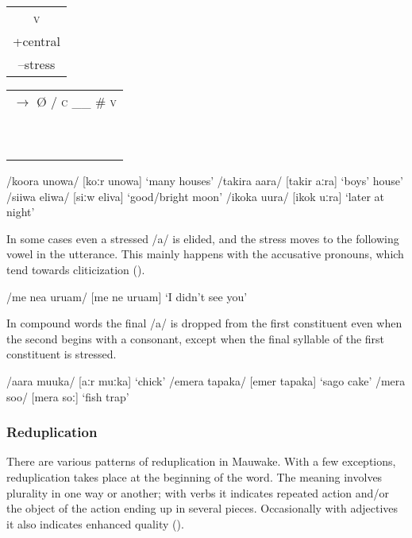 \ea
\begin{tabular}{c}\textsc{v}\\+central\\--stress\\    \end{tabular}
\begin{tabular}{c}    $\rightarrow $ {\O}  /  \textsc{c} \_\_  \#  \textsc{v} \\~\\~\\    \end{tabular}
\z

\ea
\ea
/koora unowa/  [{{\textprimstress}koːr  u{{\textprimstress}}nowa}]  `many houses'
\ex
/takira {\textphi}aara/  [ta{{\textprimstress}kir  {{\textprimstress}}}{\textphi}aːra]  `boys' house'
\ex
/siiwa eliwa/  [{{\textprimstress}siːw  e{{\textprimstress}}liva}]  `good/bright moon'
\ex
/ikoka uura/  [i{{\textprimstress}kok  {{\textprimstress}}uːra}]  `later at night'
\z
\z

In some cases even a stressed /a/ is elided, and the stress moves to the following vowel in the utterance.  This mainly happens with the accusative pronouns, which tend towards cliticization ().

\ea
/me ne{\textphi}a uru{\textphi}am/  [{{\textprimstress}me ne}{\textphi} {{\textprimstress}uru}{\textphi}am]  `I didn't see you'
\z

In compound words the final /a/ is dropped from the first constituent even when the second begins with a consonant, except when the final syllable of the first constituent is stressed.  

\ea
\ea
/aara muuka/  [{{\textprimstress}aːr {{\textprimstress}}muːka}]  `chick'
\ex
/emera tapaka/  [e{{\textprimstress}mer ta{{\textprimstress}}paka}]  `sago cake'
\ex
/mera soo/  [me{{\textprimstress}ra {{\textprimstress}}soː}]  `fish trap'
\z
\z

\subsubsection{Reduplication}\label{sec:2.3.3.2}

There are various patterns of reduplication in Mauwake. With a few exceptions, reduplication takes place at the beginning of the word.  The meaning involves plurality in one way or another; with verbs it indicates repeated action and/or the object of the action ending up in several pieces. Occasionally with adjectives it also indicates enhanced quality ().

